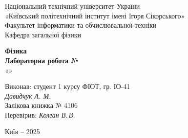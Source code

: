 \documentclass[12pt,a4paper]{article}
\begin{document}
    \begin{titlepage}

        \thispagestyle{empty}
        \begin{center}
        \large
        Національний технічний університет України\\
        «Київський політехнічний інститут імені Ігоря Сікорського»\\[1em]
        Факультет інформатики та обчислювальної техніки\\
        Кафедра загальної фізики
        \end{center}

        \vfill

        \begin{center}
        \textbf{\LARGE Фізика}\\[2em]
        \textbf{\Large Лабораторна робота №}\\
        «» 
        \end{center}

        \vfill

        \begin{flushright}
        Виконав: студент 1 курсу ФІОТ, гр. ІО-41\\
        \textit{Давидчук А. М.}\\
        Залікова книжка № 4106\\[1em]
        Перевірив: \textit{Колган В.\,В.}
        \end{flushright}

        \vfill

        \begin{center}
        Київ -- 2025
        \end{center}

    \end{titlepage}

\end{document}
